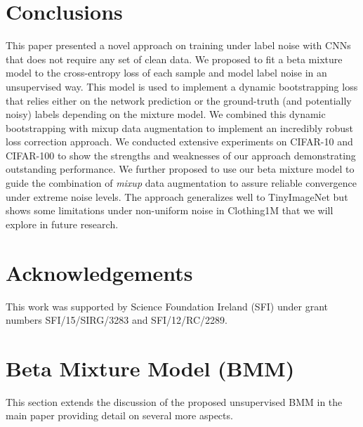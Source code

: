 \documentclass{article}
\begin{document}
\section{Conclusions}

This paper presented a novel approach on training under label noise
with CNNs that does not require any set of clean data. We proposed
to fit a beta mixture model to the cross-entropy loss of each sample
and model label noise in an unsupervised way. This model is used
to implement a dynamic bootstrapping loss that relies either on the
network prediction or the ground-truth (and potentially noisy) labels
depending on the mixture model. We combined this dynamic bootstrapping
with mixup data augmentation to implement an incredibly robust loss
correction approach. We conducted extensive experiments on CIFAR-10
and CIFAR-100 to show the strengths and weaknesses of our approach
demonstrating outstanding performance. We further proposed to use
our beta mixture model to guide the combination of \emph{mixup} data augmentation
to assure reliable convergence under extreme noise levels. The approach generalizes well to TinyImageNet but shows some limitations under non-uniform noise in Clothing1M that we will explore in future research.

\section*{Acknowledgements}
This work was supported by Science Foundation Ireland (SFI) under grant numbers SFI/15/SIRG/3283 and SFI/12/RC/2289.



 
 


\makeatother


\appendix
{}
\section{Beta Mixture Model (BMM)}

This section extends the discussion of the proposed unsupervised BMM in the main paper providing detail on several more aspects.
\end{document}
